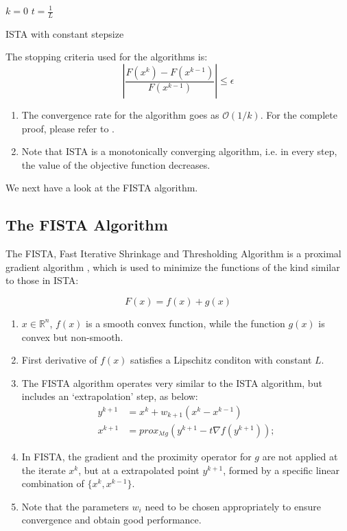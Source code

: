 \vspace{5pt}
\begin{algorithm}[H]
 $k = 0 $ \;
 $t = \frac{1}{L}$ \;
 
 \caption{ISTA with constant stepsize}
\end{algorithm}

The stopping criteria used for the algorithms is:
\begin{equation}
 \left| \frac{F(x^k) - F(x^{k-1})}{F(x^{k-1})} \right| \leq \epsilon
\end{equation}

\begin{enumerate}
\item The convergence rate for the algorithm goes as $\mathcal{O}(1/k)$.
For the complete proof, please refer to \cite{FISTA}.

\item Note that ISTA is a monotonically converging algorithm, 
i.e. in every step, the value of the objective function decreases.
\end{enumerate}

We next have a look at the FISTA algorithm.

\subsection{The FISTA Algorithm}

The FISTA, Fast Iterative Shrinkage and Thresholding Algorithm \cite{FISTA} is a proximal gradient algorithm , which is used to 
minimize the functions of the kind similar to those in ISTA:

\begin{equation}
 F(x) = f(x) + g(x)
\end{equation}

\begin{enumerate}
 \item $x \in \mathbb{R}^n$, $f(x)$ is a smooth convex function, while the function $g(x)$ is convex but non-smooth.
 \item First derivative of $f(x)$ satisfies a Lipschitz conditon with constant $L$.
 \item The FISTA algorithm operates very similar to the ISTA algorithm, but includes an `extrapolation' step, as below:
 \begin{align}
  y^{k+1} &= x^k + w_{k+1} (x^k - x^{k-1}) \\
  x^{k+1} &= prox_{\lambda tg}(y^{k+1} - t \nabla f(y^{k+1}));
 \end{align}
 \item In FISTA, the gradient and the proximity operator for $g$ are not applied at the iterate $x^k$, but at a 
 extrapolated point $y^{k+1}$, formed by a specific linear combination of $\{ x^k, x^{k-1}\}$.
 \item Note that the parameters $w_i$  need to be chosen appropriately to ensure convergence and obtain good performance.
\end{enumerate}


